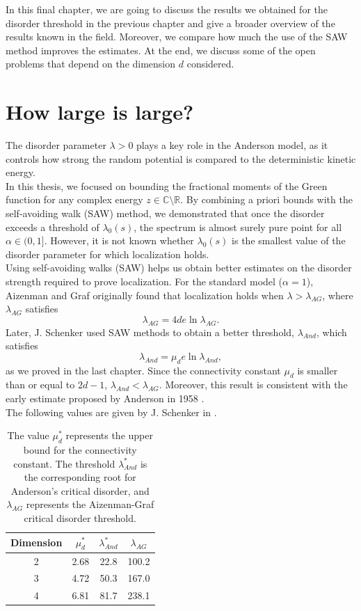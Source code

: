 \documentclass[11pt, a4paper, UKenglish, oneside]{book}
\theoremstyle{plain}
\theoremstyle{remark}
\theoremstyle{definition}
\numberwithin{equation}{section}
\numberwithin{theorem}{section}
\begin{document}
In this final chapter, we are going to discuss the results we obtained for the disorder threshold in the previous chapter and give a broader overview of the results known in the field. Moreover, we compare how much the use of the SAW method improves the estimates. At the end, we discuss some of the open problems that depend on the dimension $d$ considered.\\

\section{How large is large?}

The disorder parameter $\lambda>0$ plays a key role in the Anderson model, as it controls how strong the random potential is compared to the deterministic kinetic energy.\\

In this thesis, we focused on bounding the fractional moments of the Green function for any complex energy $z \in \mathbb{C} \setminus \mathbb{R}$. By combining a priori bounds with the self-avoiding walk (SAW) method, we demonstrated that once the disorder exceeds a threshold of $\lambda_0(s)$, the spectrum is almost surely pure point for all $\alpha \in (0,1]$. However, it is not known whether $\lambda_0(s)$ is the smallest value of the disorder parameter for which localization holds.\\

Using self-avoiding walks (SAW) helps us obtain better estimates on the disorder strength required to prove localization. For the standard model ($\alpha = 1$), Aizenman and Graf \cite{Aizenman_1998} originally found that localization holds when $\lambda > \lambda_{AG}$, where $\lambda_{AG}$ satisfies
\[
\lambda_{AG}=4de\ln \lambda_{AG}.
\]
Later, J. Schenker \cite{schenker2015} used SAW methods to obtain a better threshold, $\lambda_{And}$, which satisfies
\[
\lambda_{And}=\mu_d e\ln \lambda_{And},
\]
as we proved in the last chapter. Since the connectivity constant $\mu_d$ is smaller than or equal to $2d-1$, $\lambda_{And}< \lambda_{AG}$. Moreover, this result is consistent with the early estimate proposed by Anderson in 1958 \cite{anderson1958}.\\

The following values are given by J. Schenker in \cite{schenker2015}.
\begin{table}[htpb]
\centering
\begin{tabular}{cccc}
\hline
Dimension & $\mu_d^*$ & $\lambda_{And}^*$ & $\lambda_{AG}$ \\
\hline
2 & 2.68 & 22.8 & 100.2 \\
3 & 4.72 & 50.3 & 167.0 \\
4 & 6.81 & 81.7 & 238.1 \\
\hline
\end{tabular}
\caption{The value $\mu_d^*$ represents the upper bound for the connectivity constant. The threshold $\lambda_{And}^*$ is the corresponding root for Anderson's critical disorder, and $\lambda_{AG}$ represents the Aizenman-Graf critical disorder threshold.}
\label{tab:lambda_comparison}
\end{table}
\end{document}
